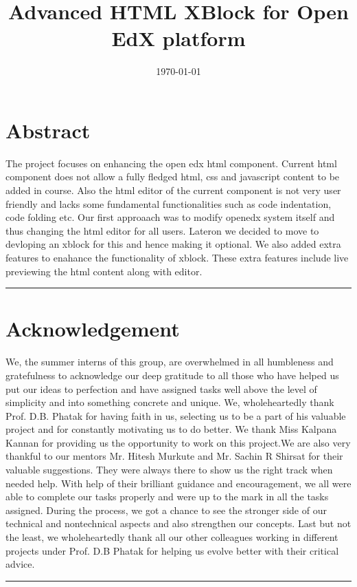 \documentclass[a4paper, twosided, openany]{memoir}
\begin{document}
\pagestyle{plain}
\title{Advanced HTML XBlock for Open EdX platform}
\date{\today}

\frontmatter

\maketitle

\chapter*{Abstract}
The project focuses on enhancing the open edx html component. Current html component does not
allow a fully fledged html, css and javascript content to be added in course. Also the html editor of
the current component is not very user friendly and lacks some fundamental functionalities such as
code indentation, code folding etc. Our first approaach was to modify openedx system itself and
thus changing the html editor for all users. Lateron we decided to move to devloping an xblock for
this and hence making it optional. We also added extra features to enahance the functionality of
xblock. These extra features include live previewing the html content along with editor.\newline
\par\fancybreak{$***$}\par

\newpage

\chapter*{Acknowledgement}
	We, the summer interns of this group, are overwhelmed in all humbleness and
gratefulness to acknowledge our deep gratitude to all those who have helped us put
our ideas to perfection and have assigned tasks well above the level of simplicity and
into something concrete and unique.
We, wholeheartedly thank Prof. D.B. Phatak for having faith in us, selecting us to be
a part of his valuable project and for constantly motivating us to do better.
We thank Miss Kalpana Kannan for providing us the opportunity to work on this
project.We are also very thankful to our mentors Mr. Hitesh Murkute and Mr. Sachin R Shirsat
for their valuable suggestions. They were always there to show us the right track when needed help.
With help of their brilliant guidance and encouragement, we all were able to complete
our tasks properly and were up to the mark in all the tasks assigned. During the
process, we got a chance to see the stronger side of our technical and nontechnical
aspects and also strengthen our concepts.
Last but not the least, we wholeheartedly thank all our other colleagues working in
different projects under Prof. D.B Phatak for helping us evolve better with their critical advice.\newline
\par\fancybreak{$***$}\par
\newpage

\tableofcontents

\mainmatter





\end{document}
